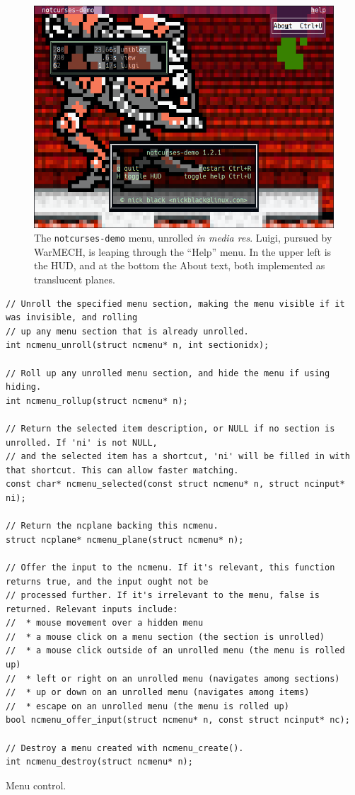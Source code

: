 \documentclass[letterpaper,10pt]{article}
\begin{document}
\begin{figure}
    \centering
    \includegraphics[width=.75\linewidth]{media/menuwarmech.png}
    \caption[WarMECH and a translucent menu.]{The \texttt{notcurses-demo} menu, unrolled \textit{in media res}. Luigi, pursued
      by WarMECH, is leaping through the ``Help'' menu. In the upper left is the HUD,
      and at the bottom the About text, both implemented as translucent planes.}
\end{figure}

\begin{listing}[!htb]
\begin{verbatim}
// Unroll the specified menu section, making the menu visible if it was invisible, and rolling
// up any menu section that is already unrolled.
int ncmenu_unroll(struct ncmenu* n, int sectionidx);

// Roll up any unrolled menu section, and hide the menu if using hiding.
int ncmenu_rollup(struct ncmenu* n);

// Return the selected item description, or NULL if no section is unrolled. If 'ni' is not NULL,
// and the selected item has a shortcut, 'ni' will be filled in with that shortcut. This can allow faster matching.
const char* ncmenu_selected(const struct ncmenu* n, struct ncinput* ni);

// Return the ncplane backing this ncmenu.
struct ncplane* ncmenu_plane(struct ncmenu* n);

// Offer the input to the ncmenu. If it's relevant, this function returns true, and the input ought not be
// processed further. If it's irrelevant to the menu, false is returned. Relevant inputs include:
//  * mouse movement over a hidden menu
//  * a mouse click on a menu section (the section is unrolled)
//  * a mouse click outside of an unrolled menu (the menu is rolled up)
//  * left or right on an unrolled menu (navigates among sections)
//  * up or down on an unrolled menu (navigates among items)
//  * escape on an unrolled menu (the menu is rolled up)
bool ncmenu_offer_input(struct ncmenu* n, const struct ncinput* nc);

// Destroy a menu created with ncmenu_create().
int ncmenu_destroy(struct ncmenu* n);
\end{verbatim}
\caption{Menu control.}
\label{list:menucontrol}
\end{listing}
\end{document}
